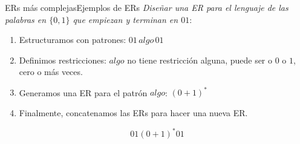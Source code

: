 \documentclass[spanish]{beamer}
\begin{document}
\begin{frame}{ERs más complejas}{Ejemplos de ERs}
    \textit{Diseñar una ER para el lenguaje de las palabras en $\{0,1\}$ que empiezan y terminan en $01$}: \pause

    \bigskip

    \begin{enumerate}
        \item Estructuramos con patrones:
        $01 \, algo \, 01$ \pause 
        \item Definimos restricciones:
        $algo$ no tiene restricción alguna, puede ser o $0$ o $1$, cero o más veces.\pause
        \item Generamos una ER para el patrón $algo$:
        $(0 + 1)^*$ \pause
        \item Finalmente, concatenamos las ERs para hacer una nueva ER.
    \end{enumerate}

    \[01(0+1)^*01\]
\end{frame}



% 
% 
\end{document}
